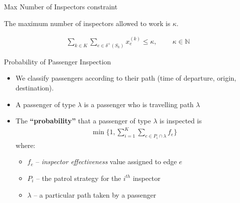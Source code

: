 \documentclass[handout]{beamer}
\begin{document}
\begin{frame}{Max Number of Inspectors constraint}

\begin{tcolorbox}[colback=yellow!5!white,colframe=yellow!75!black, title=Intuition]
  The maximum number of inspectors allowed to work is $\kappa$.
\end{tcolorbox}
\vspace{5mm}

\begin{tcolorbox}[colback=blue!5!white,colframe=blue!75!black]
\begin{align*}
        \sum_{k\in K} \sum_{e\in\delta^+(S_k)}x_e^{(k)}\le \kappa,\qquad \ \kappa \in \mathbb{N}
\end{align*}
\end{tcolorbox}
\end{frame}

\begin{frame}{Probability of Passenger Inspection}
    \begin{itemize}
        \item We classify passengers according to their path (time of departure, origin, destination). 
        \item A passenger of type $\lambda$ is a passenger who is travelling path $\lambda$ \pause
        
        \item The \textbf{``probability''} that a passenger of type $\lambda$ is inspected is \citep{jiang_yin_johnson_tambe_kiekintveld_leyton-brown_sandholm_2012}
    \begin{align*}
       \min\bigg\{1,\sum_{i=1}^K\sum_{e\in P_i\cap\lambda} f_e\bigg\}
    \end{align*}
    where:
    \begin{itemize}
        \item $f_e$ -- \textit{inspector effectiveness} value assigned to edge $e$
        \item $P_i$ -- the patrol strategy for the $i^{th}$ inspector
        \item $\lambda$ -- a particular path taken by a passenger
    \end{itemize}
    \end{itemize}
\end{frame}
\end{document}
